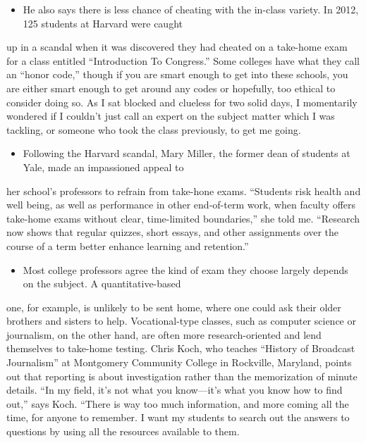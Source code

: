 \documentclass[UTF8,11pt]{ctexart}
\begin{document}
\begin{itemize}[leftmargin=2em,itemsep=.2em,topsep=.4em]\item[D.] He also says there is less chance of cheating with the in-class variety. In 2012, 125 students at Harvard were caught
\end{itemize}

up in a scandal when it was discovered they had cheated on a take-home exam for a class entitled “Introduction To Congress.” Some colleges have what they call an “honor code,” though if you are smart enough to get into these schools, you are either smart enough to get around any codes or hopefully, too ethical to consider doing so. As I sat blocked and clueless for two solid days, I momentarily wondered if I couldn’t just call an expert on the subject matter which I was tackling, or someone who took the class previously, to get me going.


\begin{itemize}[leftmargin=2em,itemsep=.2em,topsep=.4em]\item[E.] Following the Harvard scandal, Mary Miller, the former dean of students at Yale, made an impassioned appeal to
\end{itemize}

her school’s professors to refrain from take-hone exams. “Students risk health and well being, as well as performance in other end-of-term work, when faculty offers take-home exams without clear, time-limited boundaries,” she told me. “Research now shows that regular quizzes, short essays, and other assignments over the course of a term better enhance learning and retention.”


\begin{itemize}[leftmargin=2em,itemsep=.2em,topsep=.4em]\item[F.] Most college professors agree the kind of exam they choose largely depends on the subject. A quantitative-based
\end{itemize}

one, for example, is unlikely to be sent home, where one could ask their older brothers and sisters to help. Vocational-type classes, such as computer science or journalism, on the other hand, are often more research-oriented and lend themselves to take-home testing. Chris Koch, who teaches “History of Broadcast Journalism” at Montgomery Community College in Rockville, Maryland, points out that reporting is about investigation rather than the memorization of minute details. “In my field, it’s not what you know—it’s what you know how to find out,” says Koch. “There is way too much information, and more coming all the time, for anyone to remember. I want my students to search out the answers to questions by using all the resources available to them.
\end{document}
